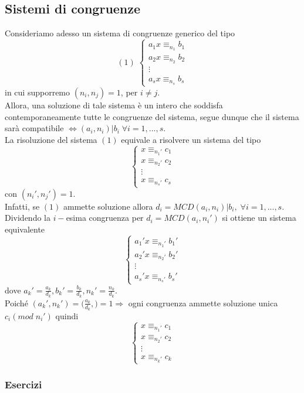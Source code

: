 \begin{flushleft}
\subsection{Sistemi di congruenze}
Consideriamo adesso un sistema di congruenze generico del tipo
\[(1)\; \begin{cases}
a_1x\equiv_{n_1} b_1\\
a_2x\equiv_{n_2} b_2\\
\vdots\\
a_sx\equiv_{n_s} b_s
\end{cases}
\]
in cui supporremo $(n_i, n_j) = 1$, per $i\neq j$.\\
Allora, una soluzione di tale sistema è un intero che soddisfa contemporaneamente tutte le congruenze del sistema, segue dunque che il sistema sarà compatibile $\Leftrightarrow (a_i, n_i)|b_i\;\forall i = 1,...,s$.\\
La risoluzione del sistema $(1)$ equivale a risolvere un sistema del tipo
\[\begin{cases}
x\equiv_{n_1'} c_1\\
x\equiv_{n_2'} c_2\\
\vdots\\
x\equiv_{n_s'} c_s
\end{cases}
\]
con $(n_i', n_j') = 1$.\\
Infatti, se $(1)$ ammette soluzione allora $d_i = MCD(a_i, n_i)| b_i,\;\forall i=1,...,s$.\\
Dividendo la $i-$esima congruenza per $d_i =MCD(a_i, n_i')$ si ottiene un sistema equivalente
\[\begin{cases}
a_1'x\equiv_{n_1'} b_1'\\
a_2'x\equiv_{n_2'} b_2'\\
\vdots\\
a_s'x\equiv_{n_s'} b_s'
\end{cases}
\]
dove $a_k' = \frac{a_k}{d_k}, b_k' = \frac{b_k}{d_k}, n_k' = \frac{n_k}{d_k}$.\\
Poiché $(a_k', n_k') = \big(\frac{a_k}{d_k}, \bigr) = 1\Rightarrow $ ogni congruenza ammette soluzione unica $c_i (mod\;n_i')$ quindi
\[\begin{cases}
x\equiv_{n_1'} c_1\\
x\equiv_{n_2'} c_2\\
\vdots\\
x\equiv_{n_k'} c_k
\end{cases}
\]



\subsubsection{Esercizi}


\end{flushleft}
